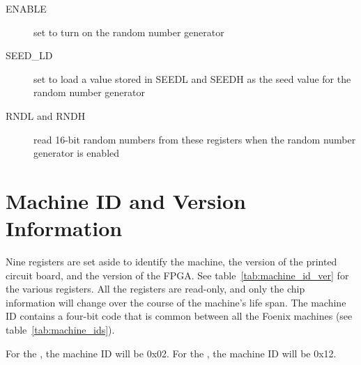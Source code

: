 \begin{description}
    \item[ENABLE] set to turn on the random number generator

    \item[SEED\_LD] set to load a value stored in SEEDL and SEEDH as the seed value for the random number generator

    \item[RNDL and RNDH] read 16-bit random numbers from these registers when the random number generator is enabled
\end{description}

\section*{Machine ID and Version Information}

Nine registers are set aside to identify the machine, the version of the printed circuit board, and the version of the FPGA. See table~\ref{tab:machine_id_ver} for the various registers. All the registers are read-only, and only the chip information will change over the course of the machine's life span. The machine ID contains a four-bit code that is common between all the Foenix machines (see table~\ref{tab:machine_ids}).

For the \jr, the machine ID will be 0x02. For the \fk, the machine ID will be 0x12.

